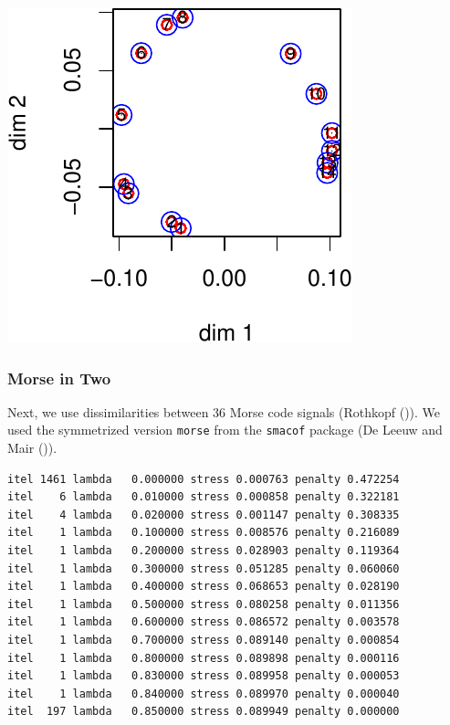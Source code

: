 \documentclass[
  12pt,
  letterpaper,
  DIV=11,
  numbers=noendperiod]{scrreprt}
\theoremstyle{remark}
\begin{document}
\begin{center}
\includegraphics{global_files/figure-pdf/okman-1.pdf}
\end{center}

\subsubsection{Morse in Two}\label{morse-in-two}

Next, we use dissimilarities between 36 Morse code signals (Rothkopf
()). We used the symmetrized version
\texttt{morse} from the \texttt{smacof} package (De Leeuw and Mair
()).

\begin{verbatim}
itel 1461 lambda   0.000000 stress 0.000763 penalty 0.472254 
itel    6 lambda   0.010000 stress 0.000858 penalty 0.322181 
itel    4 lambda   0.020000 stress 0.001147 penalty 0.308335 
itel    1 lambda   0.100000 stress 0.008576 penalty 0.216089 
itel    1 lambda   0.200000 stress 0.028903 penalty 0.119364 
itel    1 lambda   0.300000 stress 0.051285 penalty 0.060060 
itel    1 lambda   0.400000 stress 0.068653 penalty 0.028190 
itel    1 lambda   0.500000 stress 0.080258 penalty 0.011356 
itel    1 lambda   0.600000 stress 0.086572 penalty 0.003578 
itel    1 lambda   0.700000 stress 0.089140 penalty 0.000854 
itel    1 lambda   0.800000 stress 0.089898 penalty 0.000116 
itel    1 lambda   0.830000 stress 0.089958 penalty 0.000053 
itel    1 lambda   0.840000 stress 0.089970 penalty 0.000040 
itel  197 lambda   0.850000 stress 0.089949 penalty 0.000000 
\end{verbatim}
\end{document}

